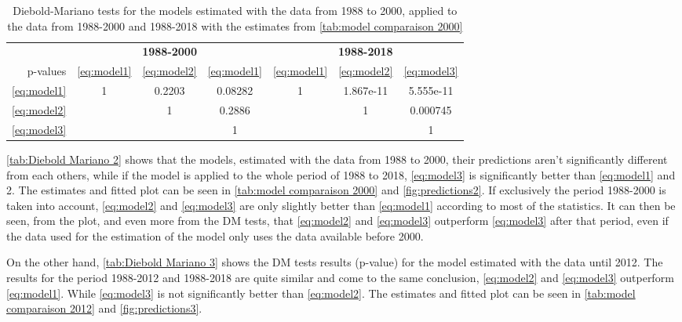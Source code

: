 \documentclass[12pt,a4paper,oneside]{book}
\begin{document}
\begin{table}[htp!]
     \caption{Diebold-Mariano tests for the models estimated with the data from 1988 to 2000, applied to the data from 1988-2000 and 1988-2018 with the estimates from \autoref{tab:model comparaison 2000}}
    \label{tab:Diebold Mariano 2}
    \centering \footnotesize
    \begin{tabular}{| r | c c c | c c c |}
 \multicolumn{1}{r}{} &    \multicolumn{3}{c}{\textbf{1988-2000}} &    \multicolumn{3}{c}{\textbf{1988-2018}} \\ \cline{2-7}
 \multicolumn{0}{r|}{p-values}	& \ref{eq:model1} & \ref{eq:model2} & \ref{eq:model1} & \ref{eq:model1} & \ref{eq:model2} & \ref{eq:model3} \\ \cline{1-7}
 \ref{eq:model1} & 1 & 0.2203 & 0.08282  & 1 & 1.867e-11 & 5.555e-11 \\ 
 \ref{eq:model2} &   & 1  	& 0.2886  	&   & 1 & 0.000745 \\
 \ref{eq:model3} &   &    & 1 &   &   & 1   \\ \cline{1-7}
\end{tabular}
\end{table}

\autoref{tab:Diebold Mariano 2} shows that the models, estimated with the data from 1988 to 2000, their predictions aren't significantly different from each others, while if the model is applied to the whole period of 1988 to 2018, \ref{eq:model3} is significantly better than \ref{eq:model1} and 2.
The estimates and fitted plot can be seen in \autoref{tab:model comparaison 2000} and \autoref{fig:predictions2}.
If exclusively the period 1988-2000 is taken into account, \ref{eq:model2} and \ref{eq:model3} are only slightly better than \ref{eq:model1} according to most of the statistics.
It can then be seen, from the plot, and even more from the DM tests, that \ref{eq:model2} and \ref{eq:model3} outperform \ref{eq:model3} after that period, even if the data used for the estimation of the model only uses the data available before 2000.

On the other hand, \autoref{tab:Diebold Mariano 3} shows the DM tests results (p-value) for the model estimated with the data until 2012. 
The results for the period 1988-2012 and 1988-2018 are quite similar and come to the same conclusion, \ref{eq:model2} and \ref{eq:model3} outperform \ref{eq:model1}. While \ref{eq:model3} is not significantly better than \ref{eq:model2}.
The estimates and fitted plot can be seen in \autoref{tab:model comparaison 2012} and \autoref{fig:predictions3}. 
\end{document}
